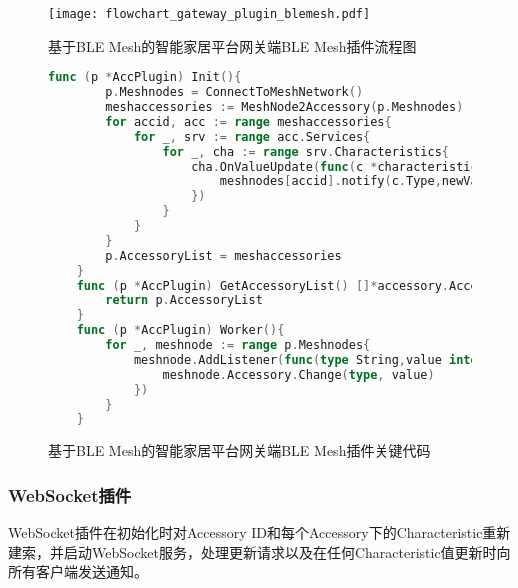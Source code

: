 \begin{figure}[H]
    \centering
    \texttt{[image: flowchart\_gateway\_plugin\_blemesh.pdf]}
    \caption{基于BLE Mesh的智能家居平台网关端BLE Mesh插件流程图}
    \label{fig:flowchart_gateway_plugin_blemesh}
\end{figure}

\begin{figure}[H]
    \centering
    \begin{lstlisting}[language=Go]
    func (p *AccPlugin) Init(){
        p.Meshnodes = ConnectToMeshNetwork()
        meshaccessories := MeshNode2Accessory(p.Meshnodes)
        for accid, acc := range meshaccessories{
            for _, srv := range acc.Services{
                for _, cha := range srv.Characteristics{
                    cha.OnValueUpdate(func(c *characteristic.Characteristic, newValue, oldValue interface{}){
                        meshnodes[accid].notify(c.Type,newValue)
                    })
                }
            }
        }
        p.AccessoryList = meshaccessories
    }
    func (p *AccPlugin) GetAccessoryList() []*accessory.Accessory{
	    return p.AccessoryList
    }
    func (p *AccPlugin) Worker(){
        for _, meshnode := range p.Meshnodes{
            meshnode.AddListener(func(type String,value interface{}){
                meshnode.Accessory.Change(type, value)
            })
        }
    }
    \end{lstlisting}
    \caption{基于BLE Mesh的智能家居平台网关端BLE Mesh插件关键代码}
    \label{fig:code_gateway_plugin_blemesh}
\end{figure}

\subsubsection{WebSocket插件}
WebSocket插件在初始化时对Accessory ID和每个Accessory下的Characteristic重新建索，并启动WebSocket服务，处理更新请求以及在任何Characteristic值更新时向所有客户端发送通知。


